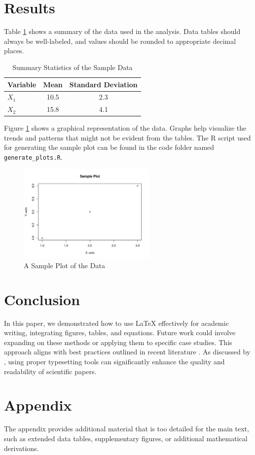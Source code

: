 \documentclass{article}
\begin{document}
\section{Results} \label{sec:results}

Table \ref{tab:sample} shows a summary of the data used in the analysis. Data tables should always be well-labeled, and values should be rounded to appropriate decimal places.

\begin{table}[htbp]
    \centering
    \caption{Summary Statistics of the Sample Data}
    \begin{tabular}{lcc}
        \toprule
        Variable & Mean & Standard Deviation \\
        \midrule
        $X_1$ & 10.5 & 2.3 \\
        $X_2$ & 15.8 & 4.1 \\
        \bottomrule
    \end{tabular}
    \label{tab:sample}
\end{table}

Figure \ref{fig:sample} shows a graphical representation of the data. Graphs help visualize the trends and patterns that might not be evident from the tables. The R script used for generating the sample plot can be found in the code folder named \texttt{generate\_plots.R}.

\begin{figure}[htbp]
    \centering
    \includegraphics[width=0.6\textwidth]{figures/sample_plot.pdf}
    \caption{A Sample Plot of the Data}

    \label{fig:sample}
\end{figure}

\section{Conclusion} \label{sec:conclusion}
In this paper, we demonstrated how to use LaTeX effectively for academic writing, integrating figures, tables, and equations. Future work could involve expanding on these methods or applying them to specific case studies. This approach aligns with best practices outlined in recent literature \citep{example1}. As discussed by \citet{example2}, using proper typesetting tools can significantly enhance the quality and readability of scientific papers.

\appendix
\section{Appendix}
The appendix provides additional material that is too detailed for the main text, such as extended data tables, supplementary figures, or additional mathematical derivations.

\newpage


\end{document}
